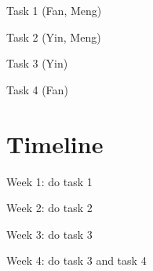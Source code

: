 \begin{compactitem}
\item Task 1 (Fan, Meng)
\item Task 2 (Yin, Meng)
\item Task 3 (Yin)
\item Task 4 (Fan)
\end{compactitem}


\section{Timeline}
\begin{compactitem}
\item Week 1: do task 1
\item Week 2: do task 2
\item Week 3: do task 3
\item Week 4: do task 3 and task 4
\end{compactitem}



